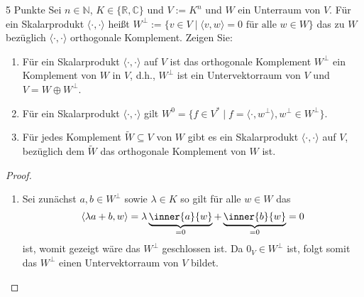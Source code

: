 \documentclass{problemset}
\author{Michael van Straten}
\begin{document}
\maketitle

\begin{problem}{5 Punkte}
Sei $n \in \mathbb{N}$, $K \in \{\mathbb{R}, \mathbb{C}\}$ und $V := K^n$ und
$W$ ein Unterraum von $V$. Für ein Skalarprodukt $\langle \cdot , \cdot
    \rangle$ heißt $W^\perp := \{v \in V \mid \langle v, w \rangle = 0 \text{ für
        alle } w \in W\}$ das zu $W$ bezüglich $\langle \cdot , \cdot \rangle$
orthogonale Komplement. Zeigen Sie:
\begin{enumerate}
    \item Für ein Skalarprodukt $\langle \cdot , \cdot \rangle$ auf $V$ ist das
          orthogonale Komplement $W^\perp$ ein Komplement von $W$ in $V$, d.h., $W^\perp$
          ist ein Untervektorraum von $V$ und $V = W \oplus W^\perp$.
    \item Für ein Skalarprodukt $\langle \cdot , \cdot \rangle$ gilt $W^0 = \{f \in V^*
              \mid f = \langle \cdot , w^\perp \rangle, w^\perp \in W^\perp\}$.
    \item Für jedes Komplement $\widetilde{W} \subseteq V$ von $W$ gibt es ein
          Skalarprodukt $\langle \cdot , \cdot \rangle$ auf $V$, bezüglich dem
          $\widetilde{W}$ das orthogonale Komplement von $W$ ist.
\end{enumerate}

\begin{proof} \hfill
    \begin{enumerate}
        \item Sei zunächst \(a, b \in W^\perp\) sowie \(\lambda \in K\) so gilt für alle \(w
              \in W\) das
              \begin{equation*}
                  \langle \lambda a + b, w \rangle = \lambda \underbrace{\inner{a}{w}}_{= 0} + \underbrace{\inner{b}{w}}_{=0} = 0
              \end{equation*}
              ist, womit gezeigt wäre das \(W^\perp\) geschlossen ist.
              Da \(0_V \in W^\perp\) ist, folgt somit das \(W^\perp\) einen
              Untervektorraum von \(V\) bildet.


\end{enumerate}
\end{proof}
\end{problem}
\end{document}
